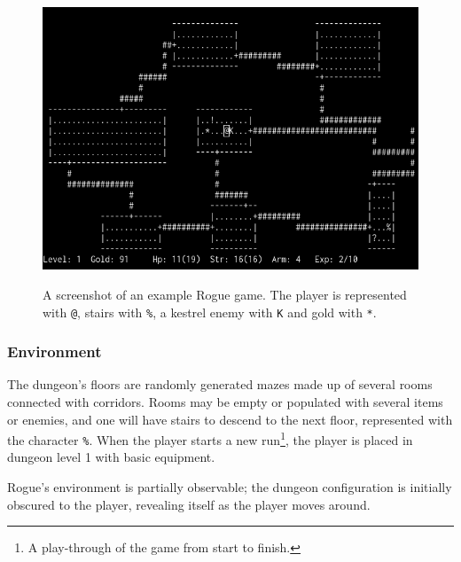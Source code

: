 \documentclass[12pt,a4paper]{article}
\begin{document}
    \begin{figure}[ht]
        \caption[A screenshot of an example Rogue game.]{A screenshot of an example Rogue game. The player is represented with \texttt{@}, stairs with \texttt{\%}, a kestrel enemy with \texttt{K} and gold with \texttt{*}.}
        \centering
        \includegraphics[scale=0.5]{rogue_screenshot}
        \label{fig:rogsc}
    \end{figure}

    \subsubsection{Environment}\label{subsubsec:environment}
    The dungeon's floors are randomly generated mazes made up of several rooms connected with corridors.
    Rooms may be empty or populated with several items or enemies, and one will have stairs to descend to the next floor,
    represented with the character \texttt{\%}.
    When the player starts a new run\footnote{A play-through of the game from start to finish.}, the player is placed in dungeon level 1 with basic equipment.

    Rogue's environment is partially observable;
    the dungeon configuration is initially obscured to the player, revealing itself as the player moves around.
\end{document}
